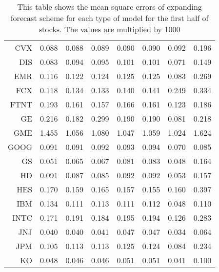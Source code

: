 \begin{table}[ht]
\begin{tabular}{rrrrrrrr}
  CVX & 0.088 & 0.088 & 0.089 & 0.090 & 0.090 & 0.092 & 0.196 \\ 
  DIS & 0.083 & 0.094 & 0.095 & 0.101 & 0.101 & 0.071 & 0.149 \\ 
  EMR & 0.116 & 0.122 & 0.124 & 0.125 & 0.125 & 0.083 & 0.269 \\ 
  FCX & 0.118 & 0.134 & 0.133 & 0.140 & 0.141 & 0.249 & 0.334 \\ 
  FTNT & 0.193 & 0.161 & 0.157 & 0.166 & 0.161 & 0.123 & 0.186 \\ 
  GE & 0.216 & 0.182 & 0.299 & 0.190 & 0.190 & 0.081 & 0.218 \\ 
  GME & 1.455 & 1.056 & 1.080 & 1.047 & 1.059 & 1.024 & 1.624 \\ 
  GOOG & 0.091 & 0.091 & 0.092 & 0.093 & 0.094 & 0.070 & 0.085 \\ 
  GS & 0.051 & 0.065 & 0.067 & 0.081 & 0.083 & 0.048 & 0.164 \\ 
  HD & 0.091 & 0.087 & 0.085 & 0.092 & 0.092 & 0.053 & 0.157 \\ 
  HES & 0.170 & 0.159 & 0.165 & 0.157 & 0.155 & 0.160 & 0.397 \\ 
  IBM & 0.134 & 0.111 & 0.113 & 0.111 & 0.112 & 0.048 & 0.110 \\ 
  INTC & 0.171 & 0.191 & 0.184 & 0.195 & 0.194 & 0.126 & 0.283 \\ 
  JNJ & 0.040 & 0.040 & 0.041 & 0.047 & 0.047 & 0.034 & 0.064 \\ 
  JPM & 0.105 & 0.113 & 0.113 & 0.125 & 0.124 & 0.084 & 0.234 \\ 
  KO & 0.048 & 0.046 & 0.046 & 0.051 & 0.051 & 0.041 & 0.100 \\ 
   \hline
\end{tabular}
\caption[MSE expanding forecast (1)]{This table shows the mean square errors of expanding forecast scheme for each type of model for the first half of stocks. 
                     The values are multiplied by 1000} 
\label{Table:MSE_e_1}
\end{table}
